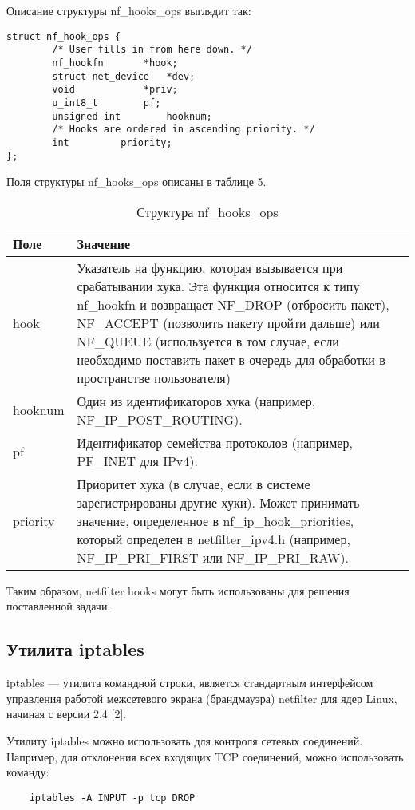Описание структуры nf\_hooks\_ops выглядит так:
\begin{lstlisting}[caption= struct nf\_hooks\_ops]
	struct nf_hook_ops {
		/* User fills in from here down. */
		nf_hookfn		*hook;
		struct net_device	*dev;
		void			*priv;
		u_int8_t		pf;
		unsigned int		hooknum;
		/* Hooks are ordered in ascending priority. */
		int			priority;
};
\end{lstlisting}

Поля структуры nf\_hooks\_ops описаны в таблице 5.

\begin{table}[h!]
	\caption{Структура nf\_hooks\_ops}
	\begin{tabular}{|p{5cm}|p{11.7cm}|}
	\hline
	Поле & Значение \\
	\hline
	hook & Указатель на функцию, которая вызывается при срабатывании хука. Эта функция относится к типу nf\_hookfn и возвращает NF\_DROP (отбросить пакет), NF\_ACCEPT (позволить пакету пройти дальше) или NF\_QUEUE (используется в том случае, если необходимо поставить пакет в очередь для обработки в пространстве пользователя) \\
	\hline
	hooknum & Один из идентификаторов хука (например, NF\_IP\_POST\_ROUTING). \\
	\hline
	pf & Идентификатор семейства протоколов (например, PF\_INET для IPv4). \\
	\hline
	priority & Приоритет хука (в случае, если в системе зарегистрированы другие хуки). Может принимать значение, определенное в nf\_ip\_hook\_priorities, который определен в netfilter\_ipv4.h (например, NF\_IP\_PRI\_FIRST или NF\_IP\_PRI\_RAW). \\
	\hline
\end{tabular}
\end{table}

Таким образом, netfilter hooks могут быть использованы для решения поставленной задачи.

\subsection*{Утилита iptables}

iptables — утилита командной строки, является стандартным интерфейсом управления работой межсетевого экрана (брандмауэра) netfilter для ядер Linux, начиная с версии 2.4 [2]. 

Утилиту iptables можно использовать для контроля сетевых соединений. Например, для отклонения всех входящих TCP соединений, можно использовать команду: 
\begin{lstlisting}
	iptables -A INPUT -p tcp DROP
\end{lstlisting}

